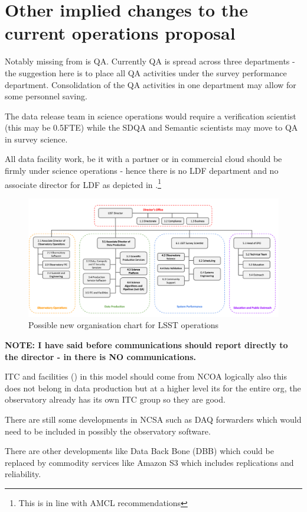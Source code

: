 


\section{Other implied changes to the current operations proposal}
Notably missing from  is \gls{QA}. Currently \gls{QA} is spread across  three
 departments - the suggestion here is to place all \gls{QA} activities under the survey performance department. Consolidation
of the \gls{QA} activities in one department may allow for some personnel saving.

The data release team in science operations would require a verification scientist (this may be 0.5FTE) while the \gls{SDQA} and Semantic scientists may move to QA in survey science.

All data facility work, be it with a partner or in commercial \gls{cloud} should be firmly under science operations - hence there is no LDF department and no associate director for LDF as depicted in .\footnote{This is  in line with AMCL recommendations}


\begin{figure}
\includegraphics[width=1.0\textwidth]{figures/OpsOrg}
\caption{Possible new organisation chart for \gls{LSST}  operations \label{fig:opsorg}}
\end{figure}

\textbf{NOTE: I have said before communications should report directly to the director - in  there is NO communications.}

ITC and facilities () in this model should come from \gls{NCOA}  logically also this does not belong in data production but at a higher level its for the entire org, the observatory already has its own \gls{ITC} group so they are good.


There are still some developments in \gls{NCSA} such as \gls{DAQ} forwarders which would need to be included in possibly the observatory \gls{software}.

There are other developments like Data Back Bone (\gls{DBB}) which could be replaced by commodity services like Amazon \gls{S3} which includes replications and reliability.

